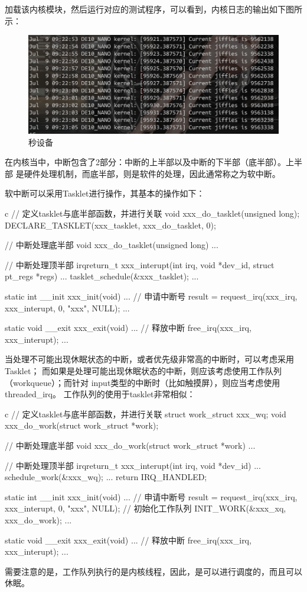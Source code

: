 加载该内核模块，然后运行对应的测试程序，可以看到，内核日志的输出如下图所示：
\begin{figure}[H]
  \centering
  \includegraphics[scale=0.5]{seconds.png}
  \caption{秒设备}
  \label{fig:seconds}
\end{figure}


在内核当中，中断包含了2部分：中断的上半部以及中断的下半部（底半部）。上半部
是硬件处理机制，而底半部，则是软件的处理，因此通常称之为软中断。

软中断可以采用Tasklet进行操作，其基本的操作如下：
\begin{code-block}{c}
// 定义tasklet与底半部函数，并进行关联
void xxx_do_tasklet(unsigned long);
DECLARE_TASKLET(xxx_tasklet, xxx_do_tasklet, 0);

// 中断处理底半部
void xxx_do_tasklet(unsigned long)
{
        ...
}

// 中断处理顶半部
irqreturn_t xxx_interupt(int irq, void *dev_id, struct pt_regs *regs)
{
        ...
        tasklet_schedule(&xxx_tasklet);
        ...
}

static int __init xxx_init(void)
{
        ...
        // 申请中断号
        result = request_irq(xxx_irq, xxx_interupt, 0, "xxx", NULL);
        ...
}

static void __exit xxx_exit(void)
{
        ...
        // 释放中断
        free_irq(xxx_irq, xxx_interupt);
        ...
}
\end{code-block}
当处理不可能出现休眠状态的中断，或者优先级非常高的中断时，可以考虑采用Tasklet；
而如果是处理可能出现休眠状态的中断，则应该考虑使用工作队列（workqueue）；而针对
input类型的中断时（比如触摸屏），则应当考虑使用threaded\_irq。
工作队列的使用于tasklet非常相似：
\begin{code-block}{c}
// 定义tasklet与底半部函数，并进行关联
struct work_struct xxx_wq;
void xxx_do_work(struct work_struct *work);

// 中断处理底半部
void xxx_do_work(struct work_struct *work)
{
        ...
}

// 中断处理顶半部
irqreturn_t xxx_interupt(int irq, void *dev_id)
{
        ...
        schedule_work(&xxx_wq);
        ...
        return IRQ_HANDLED;
}

static int __init xxx_init(void)
{
        ...
        // 申请中断号
        result = request_irq(xxx_irq, xxx_interupt, 0, "xxx", NULL);
        // 初始化工作队列
        INIT_WORK(&xxx_xq, xxx_do_work);
        ...
}

static void __exit xxx_exit(void)
{
        ...
        // 释放中断
        free_irq(xxx_irq, xxx_interupt);
        ...
}
\end{code-block}
需要注意的是，工作队列执行的是内核线程，因此，是可以进行调度的，而且可以休眠。

